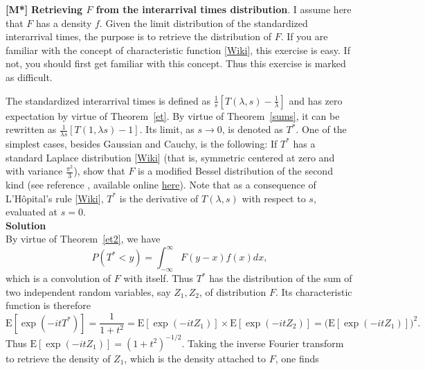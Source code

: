 \documentclass[10pt]{article}
\begin{document}
\begin{Exercise}\label{exercise13}{\bf [M*]} 
{\bf Retrieving $F$ from the interarrival times distribution}. I assume here that $F$ has a density $f$. Given the limit distribution of the standardized interarrival times, the purpose is to retrieve the distribution of $F$. If you are familiar with the concept of 
\textcolor{index}{characteristic function} [\href{https://en.wikipedia.org/wiki/Characteristic_function_(probability_theory)}{Wiki}], 
this exercise is easy. If not, you should first get familiar with this concept. Thus this exercise is marked as difficult. 

The \textcolor{index}{standardized interarrival times}
is defined as $\frac{1}{s}[T(\lambda,s)-\frac{1}{\lambda}]$ and has zero expectation by virtue of Theorem~\ref{et}. By virtue of Theorem~\ref{sums}, it can be rewritten as 
$\frac{1}{\lambda s}[T(1,\lambda s)-1]$. Its limit, as $s\rightarrow 0$, is denoted as $T^*$. One of the simplest cases, besides Gaussian and Cauchy, is the following: If $T^*$ has a standard 
\textcolor{index}{Laplace distribution} [\href{https://en.wikipedia.org/wiki/Laplace_distribution}{Wiki}]
(that is, symmetric centered at zero and with variance $\frac{\pi^2}{3}$), show that $F$ is a 
\textcolor{index}{modified Bessel distribution} of the second kind (see reference \cite{bessel}, available online 
\href{https://www.researchgate.net/publication/46553454_A_Modified_Bessel_Distribution_of_the_Second_Kind}{here}). Note that as a consequence of L'Hôpital's rule 
[\href{https://bit.ly/3sQXEbL}{Wiki}], $T^*$ is the derivative of $T(\lambda,s)$ with respect to $s$, evaluated at $s=0$. \vspace{1ex}   \\
{\bf Solution} \vspace{1ex}   \\
By virtue of Theorem~\ref{et2}, we have 
$$P(T^*<y)=\int_{-\infty}^{\infty} F(y-x)f(x)dx,$$
which is a \textcolor{index}{convolution} of $F$ with itself.
Thus $T^*$ has the distribution of the sum of two independent random variables, say $Z_1,Z_2$, of distribution $F$. Its characteristic function is therefore
$$\mbox{E}[\exp(-it T^*)]=\frac{1}{1 + t^2} = \mbox{E}[\exp(-it Z_1)]\times \mbox{E}[\exp(-it Z_2)]=\Big(\mbox{E}[\exp(-it Z_1)]\Big)^2.$$
Thus $\mbox{E}[\exp(-it Z_1)]=(1 + t^2)^{-1/2}$. Taking the inverse \textcolor{index}{Fourier transform} to retrieve the density of $Z_1$, which is the density attached to $F$, one finds

\end{Exercise}
\end{document}
